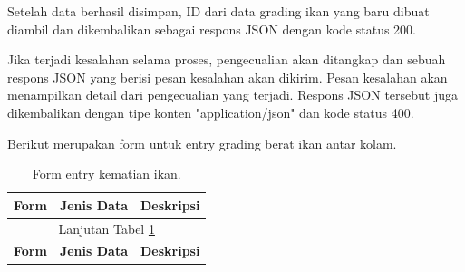 \begin{enumerate}[1.]
Setelah data berhasil disimpan, ID dari data grading ikan yang baru dibuat diambil dan dikembalikan sebagai respons JSON dengan kode status 200.

Jika terjadi kesalahan selama proses, pengecualian akan ditangkap dan sebuah respons JSON yang berisi pesan kesalahan akan dikirim. Pesan kesalahan akan menampilkan detail dari pengecualian yang terjadi. Respons JSON tersebut juga dikembalikan dengan tipe konten "application/json" dan kode status 400.


Berikut merupakan form untuk entry grading berat ikan antar kolam.

\begin{longtable}{| l | p{5cm} | p{5cm} |}
\caption{Form entry kematian ikan.\label{table:form_entry_grading_berat_ikan}}\\

\hline
\multicolumn{1}{|c|}{\textbf{Form}} & \multicolumn{1}{|c|}{\textbf{Jenis Data}} & \multicolumn{1}{|c|}{\textbf{Deskripsi}}\\
\hline
\endfirsthead

\hline
\multicolumn{3}{|c|}{Lanjutan Tabel \ref{table:form_entry_grading_berat_ikan}}\\
\hline
\multicolumn{1}{|c|}{\textbf{Form}} & \multicolumn{1}{|c|}{\textbf{Jenis Data}} & \multicolumn{1}{|c|}{\textbf{Deskripsi}}\\
\hline
\endhead

                                          


\end{longtable}
\end{enumerate}
